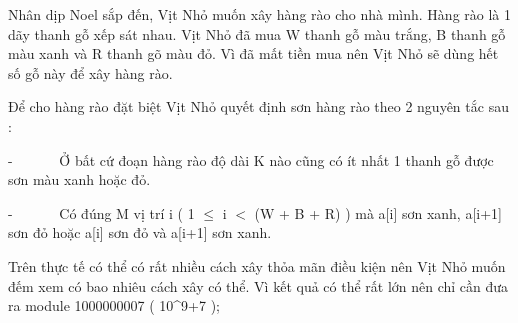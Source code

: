 Nhân dịp Noel sắp đến, Vịt Nhỏ muốn xây hàng rào cho nhà mình. Hàng rào là 1 dãy thanh gỗ xếp sát nhau. Vịt Nhỏ đã mua W thanh gỗ màu trắng, B thanh gỗ màu xanh và R thanh gõ màu đỏ. Vì đã mất tiền mua nên Vịt Nhỏ sẽ dùng hết số gỗ này để xây hàng rào.  

   Để cho hàng rào đặt biệt Vịt Nhỏ quyết định sơn hàng rào theo 2 nguyên tắc sau :  

   -       Ở bất cứ đoạn hàng rào độ dài K nào cũng có ít nhất 1 thanh gỗ được sơn màu xanh hoặc đỏ.  

   -       Có đúng M vị trí i ( 1  $\le$  i $<$ (W + B + R) ) mà a[i] sơn xanh, a[i+1] sơn đỏ hoặc a[i] sơn đỏ và a[i+1] sơn xanh.  

   Trên thực tế có thể có rất nhiều cách xây thỏa mãn điều kiện nên Vịt Nhỏ muốn đếm xem có bao nhiêu cách xây có thể. Vì kết quả có thể rất lớn nên chỉ cần đưa ra module 1000000007 ( 10^9+7 );